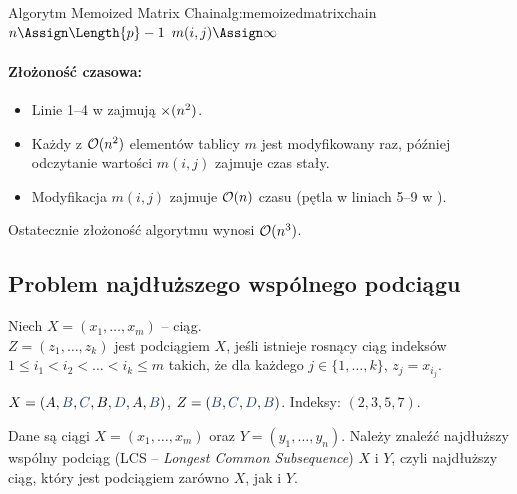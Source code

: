 \begin{alg}{Algorytm Memoized Matrix Chain}{alg:memoizedmatrixchain}
	\State $n \Assign \Length{p} - 1$
	\State $m(i, j) \Assign \infty$
	\EndFor
	\EndFor
	\State \Return {}
	\EndFunction
\end{alg}

\paragraph{Złożoność czasowa:}
\begin{itemize}
	\item Linie 1--4 w  zajmują $\mathcal{\Theta}(n^2)$.
	\item Każdy z $\mathcal{O}(n^2)$ elementów tablicy $m$ jest modyfikowany raz, później odczytanie wartości $m(i, j)$ zajmuje czas stały.
	\item Modyfikacja $m(i, j)$ zajmuje $\mathcal{O}(n)$ czasu (pętla w liniach 5--9 w ).
\end{itemize}
Ostatecznie złożoność algorytmu wynosi $\mathcal{O}(n^3)$.


\subsection{Problem najdłuższego wspólnego podciągu}

Niech $X = (x_1, \dots, x_m)$ -- ciąg. \\
$Z = (z_1, \dots, z_k)$ jest podciągiem $X$, jeśli istnieje rosnący ciąg indeksów $1 \leq i_1 < i_2 < \dots < i_k \leq m$ takich, że dla każdego $j \in \{1, \dots, k\}$, $z_j = x_{i_j}$.

\begin{example}[Podciąg]
	$X = (A, {\color{accent}B}, {\color{accent}C}, B, {\color{accent}D}, A, {\color{accent}B})$, $Z =
		({\color{accent}B}, {\color{accent}C}, {\color{accent}D}, {\color{accent}B})$.
	Indeksy: $(2, 3, 5, 7)$.
\end{example}

\begin{problem}
Dane są ciągi $X = (x_1, \dots, x_m)$ oraz $Y = (y_1, \dots, y_n)$.
Należy znaleźć najdłuższy wspólny podciąg (LCS -- \textit{Longest Common Subsequence}) $X$ i $Y$, czyli najdłuższy ciąg, który jest podciągiem zarówno $X$, jak i $Y$.
\end{problem}

